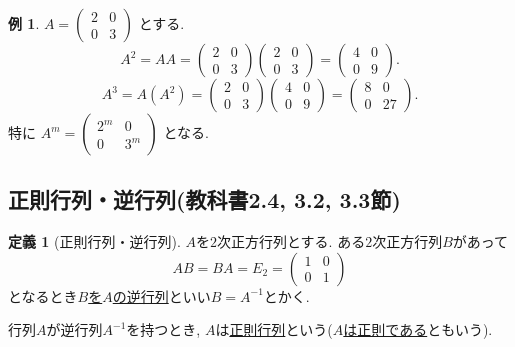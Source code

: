 \documentclass[dvipdfmx,a4paper,11pt]{article}
\theoremstyle{definition}
\newtheorem{dfn}[thm]{定義}
\newtheorem{exa}[thm]{例}
\begin{document}
  \begin{exa}
  $ A= 
 \begin{pmatrix}
2& 0\\
0 & 3
 \end{pmatrix}
$ とする. 
 $$
 A^2 =
 AA 
 =
 \begin{pmatrix}
2& 0\\
0 & 3
 \end{pmatrix}
 \begin{pmatrix}
2& 0\\
0 & 3
 \end{pmatrix}
 =  
 \begin{pmatrix}
4& 0\\
0 & 9
 \end{pmatrix}.
 $$
  $$
 A^3 =
 A(A^2) 
 =
 \begin{pmatrix}
2& 0\\
0 & 3
 \end{pmatrix}
 \begin{pmatrix}
4& 0\\
0 & 9
 \end{pmatrix}
 =  
 \begin{pmatrix}
8& 0\\
0 & 27
 \end{pmatrix}.
 $$
特に
  $
 A^m 
 =
 \begin{pmatrix}
2^m& 0\\
0 & 3^m
 \end{pmatrix}
 $
 となる. 


 \end{exa}

\subsection{正則行列・逆行列(教科書2.4, 3.2, 3.3節)}

\begin{tcolorbox}[
    colback = white,
    colframe = green!35!black,
    fonttitle = \bfseries,
    breakable = true]
    \begin{dfn}[正則行列・逆行列]
$A$を$2$次正方行列とする.
 ある$2$次正方行列$B$があって
 $$
 AB =BA =E_{2}
 = 
  \begin{pmatrix}
1& 0\\
0 &1
 \end{pmatrix}%
 $$
 となるとき\underline{$B$を$A$の逆行列}といい$B=A^{-1}$とかく.
 
 行列$A$が逆行列$A^{-1}$を持つとき, $A$は\underline{正則行列}という(\underline{$A$は正則である}ともいう).
  \end{dfn}
 \end{tcolorbox}
 
\end{document}
